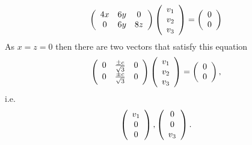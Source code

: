 \documentclass[aps,preprint]{revtex4}%
\begin{document}
\begin{equation}
\left(
\begin{array}
[c]{ccc}%
4x & 6y & 0\\
0 & 6y & 8z
\end{array}
\right)  \left(
\begin{array}
[c]{c}%
v_{1}\\
v_{2}\\
v_{3}%
\end{array}
\right)  =\left(
\begin{array}
[c]{c}%
0\\
0
\end{array}
\right)
\end{equation}
As $x=z=0$ then there are two vectors that satisfy this equation
\begin{equation}
\left(
\begin{array}
[c]{ccc}%
0 & \frac{\pm c}{\sqrt{3}} & 0\\
0 & \frac{\pm c}{\sqrt{3}} & 0
\end{array}
\right)  \left(
\begin{array}
[c]{c}%
v_{1}\\
v_{2}\\
v_{3}%
\end{array}
\right)  =\left(
\begin{array}
[c]{c}%
0\\
0
\end{array}
\right)  ,
\end{equation}
i.e.
\begin{equation}
\left(
\begin{array}
[c]{c}%
v_{1}\\
0\\
0
\end{array}
\right)  ,\left(
\begin{array}
[c]{c}%
0\\
0\\
v_{3}%
\end{array}
\right)  .
\end{equation}
\end{document}
